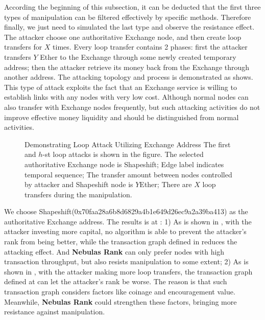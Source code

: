 According the beginning of this subsection, it can be deducted that the first three types of manipulation can be filtered effectively by specific methods. Therefore finally, we just need to simulated the last type and observe the resistance effect. The attacker choose one authoritative Exchange node, and then create loop transfers for $X$ times. Every loop transfer contains 2 phases: first the attacker transfers $Y$ Ether to the Exchange through some newly created temporary address; then the attacker retrieve its money back from the Exchange through another address. The attacking topology and process is demonstrated as  shows. This type of attack exploits the fact that an Exchange service is willing to establish links with any nodes with very low cost. Although normal nodes can also transfer with Exchange nodes frequently, but such attacking activities do not improve effective money liquidity and should be distinguished from normal activities.
\begin{figure}[!ht]
	\centering
  
	\caption{Demonstrating Loop Attack Utilizing Exchange Address \small{The first and $h$-st loop attacks is shown in the figure. The selected authoritative Exchange node is Shapeshift; Edge label indicates temporal sequence; The transfer amount between nodes controlled by attacker and Shapeshift node is $Y$Ether; There are $X$ loop transfers during the manipulation.}}\label{fig:loop}
\end{figure}

We choose Shapeshift(0x70faa28a6b8d6829a4b1e649d26ec9a2a39ba413) as the authoritative Exchange address. The results is at : 1) As is shown in , with the attacker investing more capital, no algorithm is able to prevent the attacker's rank from being better, while the transaction graph defined in  reduces the attacking effect. And \textbf{Nebulas Rank} can only prefer nodes with high transaction throughput, but also resists manipulation to some extent; 2) As is shown in , with the attacker making more loop transfers, the transaction graph defined at  can let the attacker's rank be worse. The reason is that such transaction graph considers factors like coinage and encouragement value. Meanwhile, \textbf{Nebulas Rank} could strengthen these factors, bringing more resistance against manipulation.

